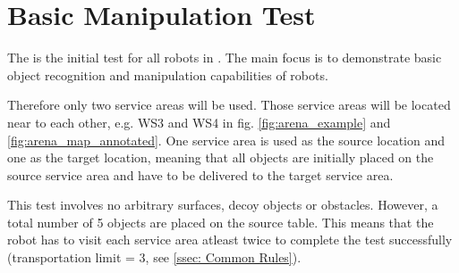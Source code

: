 
\newpage
\section{Basic Manipulation Test}
\label{sec:Basic Manipulation Test}

The  is the initial test for all robots in \RCAW .
The main focus is to demonstrate basic object recognition and manipulation capabilities of robots.

Therefore only two service areas will be used. Those service areas will be located near to each other, e.g. WS3 and WS4 in fig. \ref{fig:arena_example} and \ref{fig:arena_map_annotated}. One service area is used as the source location and one as the target location, meaning that all objects are initially placed on the source service area and have to be delivered to the target service area.

This test involves no arbitrary surfaces, decoy objects or obstacles.
However, a total number of 5 objects are placed on the source table.
This means that the robot has to visit each service area atleast twice to complete the test successfully (transportation limit = 3, see \ref{ssec: Common Rules}).



